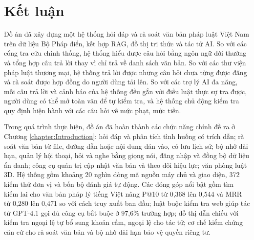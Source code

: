 \documentclass[../DoAn.tex]{subfiles}
\begin{document}
\section{Kết luận}
Đồ án đã xây dựng một hệ thống hỏi đáp và rà soát văn bản pháp luật Việt Nam trên dữ liệu Bộ Pháp điển, kết hợp RAG, đồ thị tri thức và tác tử AI. So với các cổng tra cứu chính thống, hệ thống hiểu được câu hỏi bằng ngôn ngữ đời thường và tổng hợp câu trả lời thay vì chỉ trả về danh sách văn bản. So với các thư viện pháp luật thương mại, hệ thống trả lời được những câu hỏi chưa từng được đăng và rà soát được hợp đồng do người dùng tải lên. So với các trợ lý AI đa năng, mỗi câu trả lời và cảnh báo của hệ thống đều gắn với điều luật thực sự tra được, người dùng có thể mở toàn văn để tự kiểm tra, và hệ thống chủ động kiểm tra quy định hiện hành với các câu hỏi về mức phạt, mức tiền.

Trong quá trình thực hiện, đồ án đã hoàn thành các chức năng chính đề ra ở Chương \ref{chapter:Introduction}: hỏi đáp và phân tích tình huống có trích dẫn; rà soát văn bản từ file, đường dẫn hoặc nội dung dán vào, có lưu lịch sử; bộ nhớ dài hạn, quản lý hội thoại, hỏi và nghe bằng giọng nói, đăng nhập và đồng bộ dữ liệu ẩn danh; công cụ quản trị cập nhật văn bản và theo dõi hiệu lực; văn phòng luật 3D. Hệ thống gồm khoảng 20 nghìn dòng mã nguồn máy chủ và giao diện, 372 kiểm thử đơn vị và bốn bộ đánh giá tự động. Các đóng góp nổi bật gồm tìm kiếm lai cho văn bản pháp lý tiếng Việt nâng P@10 từ 0,368 lên 0,544 và MRR từ 0,280 lên 0,471 so với cách truy xuất ban đầu; luật buộc kiểm tra web giúp tác tử GPT-4.1 gọi đủ công cụ bắt buộc ở 97,6\% trường hợp; đồ thị dẫn chiếu với kiểm tra ngoại lệ tự bổ sung khoản cấm, ngoại lệ cho tác tử; cơ chế kiểm chứng căn cứ cho rà soát văn bản và bộ nhớ dài hạn bảo vệ quyền riêng tư.
\end{document}
